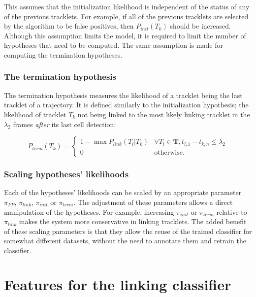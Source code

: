        		This assumes that the initialization likelihood is independent of the status of any of the previous tracklets. For example, if all of the previous tracklets are selected by the algorithm to be false positives, then $P_{init}(T_k)$ should be increased. Although this assumption limits the model, it is required to limit the number of hypotheses that need to be computed. The same assumption is made for computing the termination hypotheses.
       		
       	\subsubsection{The termination hypothesis}
       		The termination hypothesis measures the likelihood of a tracklet being the last tracklet of a trajectory. It is defined similarly to the initialization hypothesis; the likelihood of tracklet $T_k$ not being linked to the most likely linking tracklet in the $\lambda_2$ frames \textit{after} its last cell detection:
       		
       		\[
     		      P_{term}(T_k) = \begin{cases}
     		      	1 - \max{P_{link}(T_l | T_k)} & \forall T_l \in \textbf{T}, t_{l, 1} - t_{k, n} 	\leq \lambda_2\\
     		      	0 & \text{otherwise.}
     		       	\end{cases}
     		\]

		\subsubsection{Scaling hypotheses' likelihoods}
		\label{sec:tracking_scalingparameters}
		Each of the hypotheses' likelihoods can be scaled by an appropriate parameter $\pi_{FP}$, $\pi_{link}$, $\pi_{init}$ or $\pi_{term}$. The adjustment of these parameters allows a direct manipulation of the hypotheses. For example, increasing $\pi_{init}$ or $\pi_{term}$ relative to $\pi_{link}$ makes the system more conservative in linking tracklets. The added benefit of these scaling parameters is that they allow the reuse of the trained classifier for somewhat different datasets, without the need to annotate them and retrain the classifier.
	
 	\section{Features for the linking classifier}
 		\label{sec:linkerclassifierfeatures}
 		
